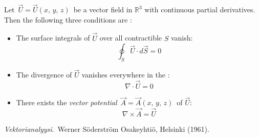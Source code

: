 \documentclass[12pt]{article}
\theoremstyle{definition}
\begin{document}
Let\, $\vec{U} = \vec{U}(x,\,y,\,z)$\, be a vector field in $\mathbb{R}^3$ with continuous partial derivatives.\, Then the following three conditions are :
\begin{itemize}
 \item The surface integrals of $\vec{U}$ over all contractible  $S$ vanish:
$$\oint_S\vec{U}\cdot d\vec{S} = 0$$
 \item The divergence of $\vec{U}$ vanishes everywhere in the :
$$\nabla\!\cdot\!\vec{U} = 0$$
 \item There exists the {\em vector potential}\, $\vec{A} = \vec{A}(x,\,y,\,z)$\, of $\vec{U}$:
$$\nabla\!\times\!\vec{A} = \vec{U}$$
\end{itemize}

\begin{thebibliography}{9}
 {\em Vektorianalyysi}. \,Werner S\"oderstr\"om Osakeyhti\"o, Helsinki (1961).
\end{thebibliography}
\end{document}

